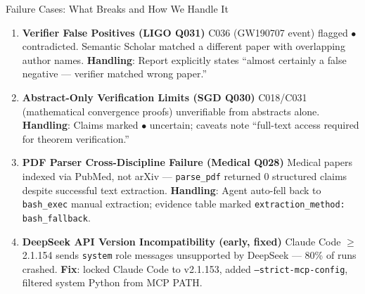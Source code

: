 \documentclass[aspectratio=169,11pt]{beamer}
\begin{document}
\begin{frame}{Failure Cases: What Breaks and How We Handle It}
  \begin{enumerate}
    \item \textbf{Verifier False Positives (LIGO Q031)}
    {\footnotesize C036 (GW190707 event) flagged \textcolor{redRYG}{$\bullet$} contradicted. Semantic Scholar matched a different paper with overlapping author names. \textbf{Handling}: Report explicitly states ``almost certainly a false negative --- verifier matched wrong paper.''}

    \item \textbf{Abstract-Only Verification Limits (SGD Q030)}
    {\footnotesize C018/C031 (mathematical convergence proofs) unverifiable from abstracts alone. \textbf{Handling}: Claims marked \textcolor{yellowRYG}{$\bullet$} uncertain; caveats note ``full-text access required for theorem verification.''}

    \item \textbf{PDF Parser Cross-Discipline Failure (Medical Q028)}
    {\footnotesize Medical papers indexed via PubMed, not arXiv --- \texttt{parse\_pdf} returned 0 structured claims despite successful text extraction. \textbf{Handling}: Agent auto-fell back to \texttt{bash\_exec} manual extraction; evidence table marked \texttt{extraction\_method: bash\_fallback}.}

    \item \textbf{DeepSeek API Version Incompatibility (early, fixed)}
    {\footnotesize Claude Code $\ge$2.1.154 sends \texttt{system} role messages unsupported by DeepSeek --- 80\% of runs crashed. \textbf{Fix}: locked Claude Code to v2.1.153, added \texttt{--strict-mcp-config}, filtered system Python from MCP PATH.}
  \end{enumerate}
\end{frame}
\end{document}
